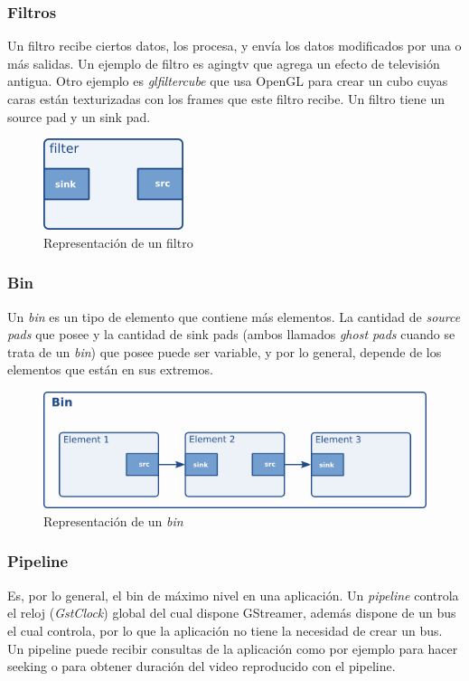 \documentclass[a4paper,openright,12pt]{report}
\begin{document}
\subsubsection{Filtros}
Un filtro recibe ciertos datos, los procesa, y envía los datos modificados por
una o más salidas. Un ejemplo de filtro es agingtv que agrega un efecto de
televisión antigua. Otro ejemplo es \textit{glfiltercube} que usa OpenGL para
crear un cubo cuyas caras están texturizadas con los frames que este filtro
recibe. Un filtro tiene un source pad y un sink pad.

\begin{figure}[h]
  \centering
    \includegraphics{../images/pwg-filter-element.png}\par
  \caption{Representación de un filtro}
\end{figure}

\subsubsection{Bin}
Un \textit{bin} es un tipo de elemento que contiene más elementos. La cantidad
de \textit{source pads} que posee y la cantidad de sink pads (ambos llamados
\textit{ghost pads} cuando se trata de un \textit{bin}) que posee puede ser
variable, y por lo general, depende de los elementos que están en sus extremos.

\begin{figure}[h]
  \centering
    \includegraphics[width=\textwidth]{../images/ad-bin.png}\par
  \caption{Representación de un \textit{bin}}
\end{figure}


\subsubsection{Pipeline}
Es, por lo general, el bin de máximo nivel en una aplicación. Un
\textit{pipeline} controla el reloj (\textit{GstClock}) global del cual dispone
GStreamer, además dispone de un bus el cual controla, por lo que la aplicación
no tiene la necesidad de crear un bus. Un pipeline puede recibir consultas de
la aplicación como por ejemplo para hacer seeking o para obtener duración del
video reproducido con el pipeline.
\end{document}
